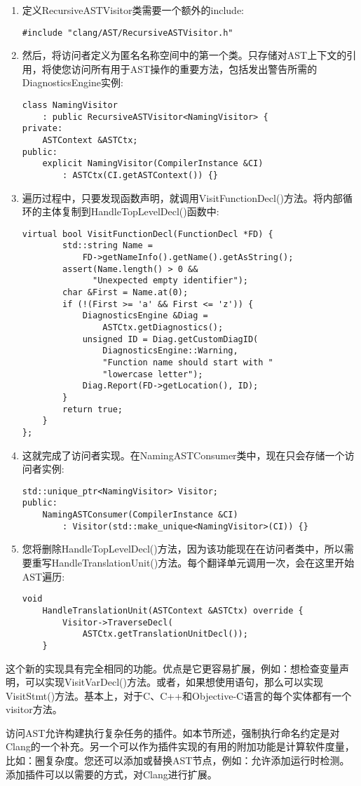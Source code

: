 \begin{enumerate}
\item 定义RecursiveASTVisitor类需要一个额外的include:
\begin{lstlisting}[caption={}]
#include "clang/AST/RecursiveASTVisitor.h"
\end{lstlisting}

\item 然后，将访问者定义为匿名名称空间中的第一个类。只存储对AST上下文的引用，将使您访问所有用于AST操作的重要方法，包括发出警告所需的DiagnosticsEngine实例:
\begin{lstlisting}[caption={}]
class NamingVisitor
	: public RecursiveASTVisitor<NamingVisitor> {
private:
	ASTContext &ASTCtx;
public:
	explicit NamingVisitor(CompilerInstance &CI)
		: ASTCtx(CI.getASTContext()) {}
\end{lstlisting}

\item 遍历过程中，只要发现函数声明，就调用VisitFunctionDecl()方法。将内部循环的主体复制到HandleTopLevelDecl()函数中:
\begin{lstlisting}[caption={}]
	virtual bool VisitFunctionDecl(FunctionDecl *FD) {
		std::string Name =
			FD->getNameInfo().getName().getAsString();
		assert(Name.length() > 0 &&
			  "Unexpected empty identifier");
		char &First = Name.at(0);
		if (!(First >= 'a' && First <= 'z')) {
			DiagnosticsEngine &Diag =
				ASTCtx.getDiagnostics();
			unsigned ID = Diag.getCustomDiagID(
				DiagnosticsEngine::Warning,
				"Function name should start with "
				"lowercase letter");
			Diag.Report(FD->getLocation(), ID);
		}
		return true;
	}
};
\end{lstlisting}

\item 这就完成了访问者实现。在NamingASTConsumer类中，现在只会存储一个访问者实例:
\begin{lstlisting}[caption={}]
	std::unique_ptr<NamingVisitor> Visitor;
public:
	NamingASTConsumer(CompilerInstance &CI)
		: Visitor(std::make_unique<NamingVisitor>(CI)) {}
\end{lstlisting}

\item 您将删除HandleTopLevelDecl()方法，因为该功能现在在访问者类中，所以需要重写HandleTranslationUnit()方法。每个翻译单元调用一次，会在这里开始AST遍历:
\begin{lstlisting}[caption={}]
	void
	HandleTranslationUnit(ASTContext &ASTCtx) override {
		Visitor->TraverseDecl(
			ASTCtx.getTranslationUnitDecl());
	}
\end{lstlisting}

\end{enumerate}

这个新的实现具有完全相同的功能。优点是它更容易扩展，例如：想检查变量声明，可以实现VisitVarDecl()方法。或者，如果想使用语句，那么可以实现VisitStmt()方法。基本上，对于C、C++和Objective-C语言的每个实体都有一个visitor方法。\par

访问AST允许构建执行复杂任务的插件。如本节所述，强制执行命名约定是对Clang的一个补充。另一个可以作为插件实现的有用的附加功能是计算软件度量，比如：圈复杂度。您还可以添加或替换AST节点，例如：允许添加运行时检测。添加插件可以以需要的方式，对Clang进行扩展。\par










